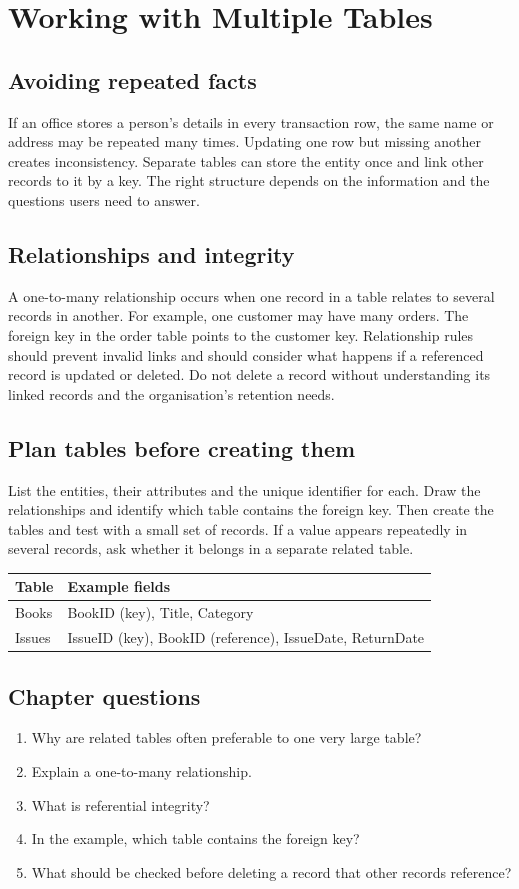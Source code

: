 \documentclass[11pt,openany,oneside]{book}
\begin{document}
\chapter{Working with Multiple Tables}
\section{Avoiding repeated facts}
If an office stores a person's details in every transaction row, the same name or address may be repeated many times. Updating one row but missing another creates inconsistency. Separate tables can store the entity once and link other records to it by a key. The right structure depends on the information and the questions users need to answer.
\section{Relationships and integrity}
A one-to-many relationship occurs when one record in a table relates to several records in another. For example, one customer may have many orders. The foreign key in the order table points to the customer key. Relationship rules should prevent invalid links and should consider what happens if a referenced record is updated or deleted. Do not delete a record without understanding its linked records and the organisation's retention needs.
\section{Plan tables before creating them}
List the entities, their attributes and the unique identifier for each. Draw the relationships and identify which table contains the foreign key. Then create the tables and test with a small set of records. If a value appears repeatedly in several records, ask whether it belongs in a separate related table.
\begin{center}\small\begin{tabularx}{.9\textwidth}{|l|X|}\hline\textbf{Table} & \textbf{Example fields}\\\hline Books & BookID (key), Title, Category\\\hline Issues & IssueID (key), BookID (reference), IssueDate, ReturnDate\\\hline\end{tabularx}\end{center}
\section{Chapter questions}
\begin{enumerate}\item Why are related tables often preferable to one very large table?\item Explain a one-to-many relationship.\item What is referential integrity?\item In the example, which table contains the foreign key?\item What should be checked before deleting a record that other records reference?\end{enumerate}
\end{document}
